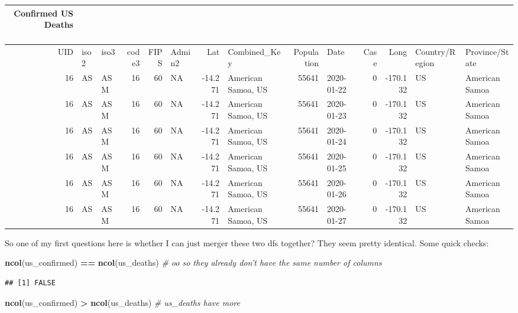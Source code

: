\documentclass[
]{article}
\newenvironment{Shaded}{\begin{snugshade}}{\end{snugshade}}
\newcommand{\CommentTok}[1]{\textcolor[rgb]{0.56,0.35,0.01}{\textit{#1}}}
\newcommand{\KeywordTok}[1]{\textcolor[rgb]{0.13,0.29,0.53}{\textbf{#1}}}
\newcommand{\NormalTok}[1]{#1}
\newcommand{\OperatorTok}[1]{\textcolor[rgb]{0.81,0.36,0.00}{\textbf{#1}}}
\newcommand{\StringTok}[1]{\textcolor[rgb]{0.31,0.60,0.02}{#1}}
\begin{document}
\captionsetup[table]{labelformat=empty,skip=1pt}
\begin{longtable}{rllrrlrlrlrrll}
\caption*{
\large Confirmed US Deaths\\ 
\small ~\\ 
} \\ 
\toprule
UID & iso2 & iso3 & code3 & FIPS & Admin2 & Lat & Combined\_Key & Population & Date & Case & Long & Country/Region & Province/State \\ 
\midrule
16 & AS & ASM & 16 & 60 & NA & -14.271 & American Samoa, US & 55641 & 2020-01-22 & 0 & -170.132 & US & American Samoa \\ 
16 & AS & ASM & 16 & 60 & NA & -14.271 & American Samoa, US & 55641 & 2020-01-23 & 0 & -170.132 & US & American Samoa \\ 
16 & AS & ASM & 16 & 60 & NA & -14.271 & American Samoa, US & 55641 & 2020-01-24 & 0 & -170.132 & US & American Samoa \\ 
16 & AS & ASM & 16 & 60 & NA & -14.271 & American Samoa, US & 55641 & 2020-01-25 & 0 & -170.132 & US & American Samoa \\ 
16 & AS & ASM & 16 & 60 & NA & -14.271 & American Samoa, US & 55641 & 2020-01-26 & 0 & -170.132 & US & American Samoa \\ 
16 & AS & ASM & 16 & 60 & NA & -14.271 & American Samoa, US & 55641 & 2020-01-27 & 0 & -170.132 & US & American Samoa \\ 
\bottomrule
\end{longtable}

So one of my first questions here is whether I can just merger these two
dfs together? They seem pretty identical. Some quick checks:

\begin{Shaded}
\begin{Highlighting}[]
\KeywordTok{ncol}\NormalTok{(us_confirmed) }\OperatorTok{==}\StringTok{ }\KeywordTok{ncol}\NormalTok{(us_deaths) }\CommentTok{# oo so they already don't have the same number of columns}
\end{Highlighting}
\end{Shaded}

\begin{verbatim}
## [1] FALSE
\end{verbatim}

\begin{Shaded}
\begin{Highlighting}[]
\KeywordTok{ncol}\NormalTok{(us_confirmed) }\OperatorTok{>}\StringTok{ }\KeywordTok{ncol}\NormalTok{(us_deaths) }\CommentTok{# us_deaths have more}
\end{Highlighting}
\end{Shaded}
\end{document}
